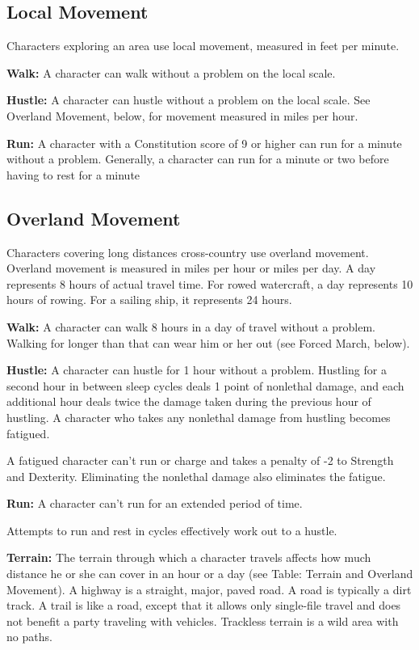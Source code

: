 \subsection{Local Movement}

Characters exploring an area use local movement, measured in feet per minute.

\textbf{Walk:} A character can walk without a problem on the local scale.

\textbf{Hustle:} A character can hustle without a problem on the local scale. See Overland Movement, below, for movement measured in miles per hour.

\textbf{Run:} A character with a Constitution score of 9 or higher can run for a minute without a problem. Generally, a character can run for a minute or two before having to rest for a minute

\subsection{Overland Movement}

Characters covering long distances cross-country use overland movement. Overland movement is measured in miles per hour or miles per day. A day represents 8 hours of actual travel time. For rowed watercraft, a day represents 10 hours of rowing. For a sailing ship, it represents 24 hours.

\textbf{Walk:} A character can walk 8 hours in a day of travel without a problem. Walking for longer than that can wear him or her out (see Forced March, below).

\textbf{Hustle:} A character can hustle for 1 hour without a problem. Hustling for a second hour in between sleep cycles deals 1 point of nonlethal damage, and each additional hour deals twice the damage taken during the previous hour of hustling. A character who takes any nonlethal damage from hustling becomes fatigued.

A fatigued character can't run or charge and takes a penalty of -2 to Strength and Dexterity. Eliminating the nonlethal damage also eliminates the fatigue.

\textbf{Run:} A character can't run for an extended period of time.

Attempts to run and rest in cycles effectively work out to a hustle.

\textbf{Terrain:} The terrain through which a character travels affects how much distance he or she can cover in an hour or a day (see Table: Terrain and Overland Movement). A highway is a straight, major, paved road. A road is typically a dirt track. A trail is like a road, except that it allows only single-file travel and does not benefit a party traveling with vehicles. Trackless terrain is a wild area with no paths.


